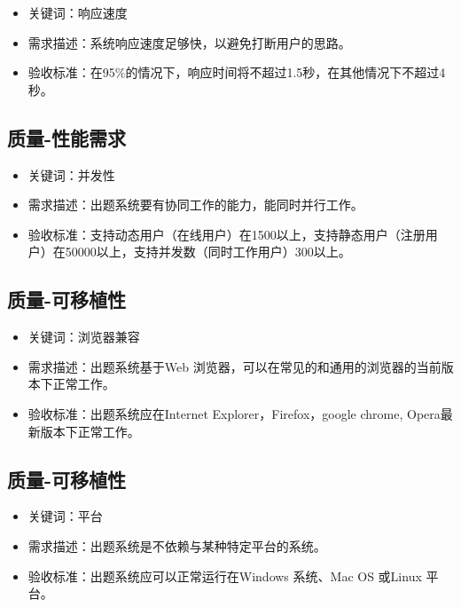 \documentclass[hyperref, a4paper]{ctexart}
\providecommand{\tightlist}{%
  \setlength{\itemsep}{0pt}\setlength{\parskip}{0pt}}
\begin{document}
\begin{itemize}
\tightlist
\item
  关键词：响应速度
\item
  需求描述：系统响应速度足够快，以避免打断用户的思路。
\item
  验收标准：在95\%的情况下，响应时间将不超过1.5秒，在其他情况下不超过4秒。
\end{itemize}

\hypertarget{ux8d28ux91cf-ux6027ux80fdux9700ux6c42-1}{%
\subsection{质量-性能需求}\label{ux8d28ux91cf-ux6027ux80fdux9700ux6c42-1}}

\begin{itemize}
\tightlist
\item
  关键词：并发性
\item
  需求描述：出题系统要有协同工作的能力，能同时并行工作。
\item
  验收标准：支持动态用户（在线用户）在1500以上，支持静态用户（注册用户）在50000以上，支持并发数（同时工作用户）300以上。
\end{itemize}

\hypertarget{ux8d28ux91cf-ux53efux79fbux690dux6027}{%
\subsection{质量-可移植性}\label{ux8d28ux91cf-ux53efux79fbux690dux6027}}

\begin{itemize}
\tightlist
\item
  关键词：浏览器兼容
\item
  需求描述：出题系统基于Web
  浏览器，可以在常见的和通用的浏览器的当前版本下正常工作。
\item
  验收标准：出题系统应在Internet Explorer，Firefox，google chrome,
  Opera最新版本下正常工作。
\end{itemize}

\hypertarget{ux8d28ux91cf-ux53efux79fbux690dux6027-1}{%
\subsection{质量-可移植性}\label{ux8d28ux91cf-ux53efux79fbux690dux6027-1}}

\begin{itemize}
\tightlist
\item
  关键词：平台
\item
  需求描述：出题系统是不依赖与某种特定平台的系统。
\item
  验收标准：出题系统应可以正常运行在Windows 系统、Mac OS 或Linux 平台。
\end{itemize}
\end{document}
